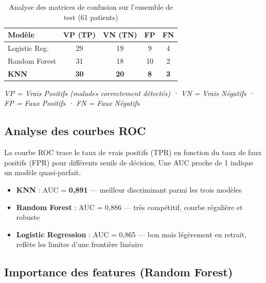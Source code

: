 \documentclass[12pt,a4paper]{article}
\newcommand{\model}[1]{\textbf{\textcolor{medblue}{#1}}}
\newcommand{\best}[1]{\textbf{\textcolor{medgreen}{#1}}}
\begin{document}
            \begin{table}[H]
              \centering
              \caption{Analyse des matrices de confusion sur l'ensemble de test (61 patients)}
              \label{tab:cm}
              \begin{tabular}{lcccc}
                \toprule
                \textbf{Modèle} & \textbf{VP (TP)} & \textbf{VN (TN)} & \textbf{FP} & \textbf{FN} \\
                \midrule
                Logistic Reg.        & 29 & 19 & 9 & 4 \\
                Random Forest        & 31 & 18 & 10 & 2 \\
                \best{KNN}           & \best{30} & \best{20} & \best{8} & \best{3} \\
                \bottomrule
              \end{tabular}
            \end{table}
            
            \textit{VP = Vrais Positifs (malades correctement détectés) · VN = Vrais Négatifs · FP = Faux Positifs · FN = Faux Négatifs}
            
            \subsection{Analyse des courbes ROC}
            
            La courbe ROC trace le taux de vrais positifs (TPR) en fonction du taux de faux positifs (FPR) pour différents seuils de décision. Une AUC proche de 1 indique un modèle quasi-parfait.
                        
            \begin{itemize}
              \item \model{KNN} : AUC = \best{0{,}891} — meilleur discriminant parmi les trois modèles
              \item \model{Random Forest} : AUC = 0{,}886 — très compétitif, courbe régulière et robuste
              \item \model{Logistic Regression} : AUC = 0{,}865 — bon mais légèrement en retrait, reflète les limites d'une frontière linéaire
            \end{itemize}
        \subsection{Importance des features (Random Forest)}
\end{document}
